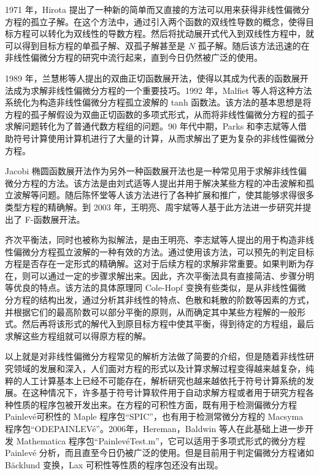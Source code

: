 1971 年，Hirota 提出了一种新的简单而又直接的方法可以用来获得非线性偏微分方程的孤立子解。在这个方法中，通过引入两个函数的双线性导数的概念，使得目标方程可以转化为双线性的导数方程。然后将扰动展开式代入到双线性方程中，就可以得到目标方程的单孤子解、双孤子解甚至是 $N$ 孤子解。随后该方法迅速的在非线性偏微分方程的研究中流行起来，直到今日仍然被广泛的使用。

1989 年，兰慧彬等人提出的双曲正切函数展开法，使得以其成为代表的函数展开法成为求解非线性偏微分方程的一个重要技巧。1992 年，Malfiet 等人将这种方法系统化为构造非线性偏微分方程孤立波解的 tanh 函数法。该方法的基本思想是将方程的孤子解假设为双曲正切函数的多项式形式，从而将非线性偏微分方程的孤子求解问题转化为了普通代数方程组的问题。90 年代中期，Parks 和李志斌等人借助符号计算使用计算机进行了大量的计算，从而求解出了更为复杂的非线性偏微分方程。

Jacobi 椭圆函数展开法作为另外一种函数展开法也是一种常见用于求解非线性偏微分方程的方法。该方法是由刘式适等人提出并用于解决某些方程的冲击波解和孤立波解等问题。随后陈怀堂等人该方法进行了各种扩展和推广，使其能够求得很多类型方程的精确解。到 2003 年，王明亮、周宇斌等人基于此方法进一步研究并提出了 F-函数展开法。

齐次平衡法，同时也被称为拟解法，是由王明亮、李志斌等人提出的用于构造非线性偏微分方程孤立波解的一种有效的方法。通过使用该方法，可以预先的判定目标方程是否存在一定形式的精确解。这对于后续方程的求解非常重要。如果判断为存在，则可以通过一定的步骤求解出来。因此，齐次平衡法具有直接简洁、步骤分明等优良的特点。该方法的具体原理同 Cole-Hopf 变换有些类似，是从非线性偏微分方程的结构出发，通过分析其非线性的特点、色散和耗散的阶数等因素的方式，并根据它们的最高阶数可以部分平衡的原则，从而确定其中某些方程解的一般形式。然后再将该形式的解代入到原目标方程中使其平衡，得到待定的方程组，最后求解这些方程组就可以得原方程的解。

以上就是对非线性偏微分方程常见的解析方法做了简要的介绍，但是随着非线性研究领域的发展和深入，人们面对方程的形式以及计算求解过程变得越来越复杂，纯粹的人工计算基本上已经不可能存在，解析研究也越来越依托于符号计算系统的发展。在这种情况下，许多基于符号计算软件用于自动求解方程或者用于研究方程各种性质的程序包被开发出来。在方程的可积性方面，既有用于检测偏微分方程 Painlev\'{e}可积性的 Maple 程序包“SPIC”，也有用于检测常微分方程的  Macsyma 程序包“ODEPAINLEV\'{e}”。2006年，Hereman，Baldwin 等人在此基础上进一步开发  Mathematica 程序包“Painlev\'{e}Test.m”，它可以适用于多项式形式的微分方程 Painlev\'{e} 分析，而且直至今日仍被广泛的使用。但是目前用于判定偏微分方程诸如 B\"{a}cklund 变换，Lax 可积性等性质的程序包还没有出现。


